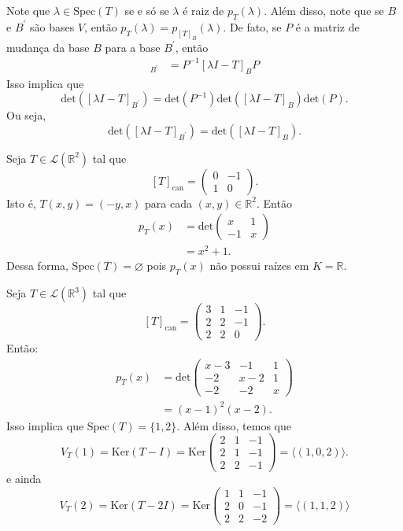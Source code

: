 \documentclass[11pt,twoside,a4paper]{book}
\begin{document}
\noindent
Note que \(\lambda\in\text{Spec}(T)\) se e só se \(\lambda\) é raiz de \(p_T(\lambda)\). Além disso, note que se  \(B\) e \(B^\prime\) são bases \(V\), então \(p_T(\lambda)=p_{[T]_B}(\lambda)\). De fato, se \(P\) é a matriz de mudança da base \(B\) para a base \(B^\prime\), então
\begin{align*}
[\lambda I - T]_{B^\prime}&=P^{-1}[\lambda I - T]_{B}P
\end{align*}
Isso implica que \[\text{det}([\lambda I- T]_{B^\prime})=\text{det}(P^{-1})\text{det}([\lambda I - T]_B)\text{det}(P).\]
Ou seja,
\[\text{det}([\lambda I- T]_{B^\prime})=\text{det}([\lambda I - T]_B).\]
\begin{exemplo}
Seja \(T\in\mathcal{L}(\mathbb{R}^2)\) tal que \[[T]_{\text{can}}=\begin{pmatrix}
0 & -1\\1 & 0
\end{pmatrix}.\]
Isto é, \(T(x,y)=(-y,x)\) para cada \((x,y)\in\mathbb{R}^2\). Então 
\begin{align*}
p_T(x)&=\text{det}\begin{pmatrix}
x & 1\\-1 & x
\end{pmatrix}\\&=x^2+1.
\end{align*}
Dessa forma, \(\text{Spec}(T)=\varnothing\) pois \(p_T(x)\) não possui raízes em \(K=\mathbb{R}\).
\end{exemplo}

\begin{exemplo}
Seja \(T\in\mathcal{L}(\mathbb{R}^3)\) tal que\[[T]_{\text{can}}=\begin{pmatrix}
3 & 1 & -1\\2 & 2 & -1\\ 2 & 2 & 0
\end{pmatrix}.\]
Então:
\begin{align*}
p_T(x)&=\text{det}\begin{pmatrix}
x-3 & -1 & 1 \\ -2 & x-2 & 1 \\ -2 & -2 & x
\end{pmatrix}\\&=(x-1)^2(x-2).
\end{align*}
Isso implica que \(\text{Spec}(T)=\{1,2\}\). Além disso, temos que
\[V_T(1)=\text{Ker}(T-I)=\text{Ker}\begin{pmatrix}
2 & 1 & -1\\2 & 1 & -1\\ 2 & 2 & -1
\end{pmatrix}=\langle (1,0,2)\rangle.\]
e ainda
\[V_T(2)=\text{Ker}(T-2 I)=\text{Ker}\begin{pmatrix}
1 & 1 & -1\\2 & 0 & -1\\ 2 & 2 & -2
\end{pmatrix}=\langle (1,1,2)\rangle\]
\end{exemplo}
\end{document}
